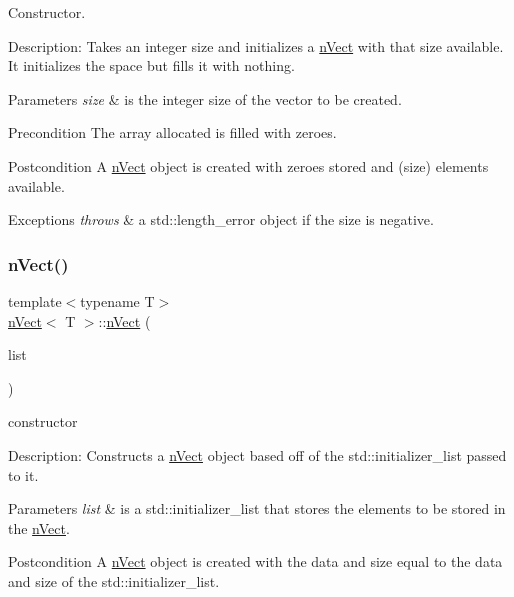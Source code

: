 Constructor. 

Description\+: Takes an integer size and initializes a \hyperlink{classnVect}{n\+Vect} with that size available. It initializes the space but fills it with nothing. 
\begin{DoxyParams}{Parameters}
{\em size} & is the integer size of the vector to be created. \\
\hline
\end{DoxyParams}
\begin{DoxyPrecond}{Precondition}
The array allocated is filled with zeroes. 
\end{DoxyPrecond}
\begin{DoxyPostcond}{Postcondition}
A \hyperlink{classnVect}{n\+Vect} object is created with zeroes stored and (size) elements available. 
\end{DoxyPostcond}

\begin{DoxyExceptions}{Exceptions}
{\em throws} & a std\+::length\+\_\+error object if the size is negative. \\
\hline
\end{DoxyExceptions}
\mbox{\label{classnVect_a8b77a6ebdc28746d61eebb7d8bbc0691}} 
\subsubsection{\texorpdfstring{n\+Vect()}{nVect()}\hspace{0.1cm}{\footnotesize\ttfamily [3/4]}}
{\footnotesize\ttfamily template$<$typename T$>$ \\
\hyperlink{classnVect}{n\+Vect}$<$ T $>$\+::\hyperlink{classnVect}{n\+Vect} (\begin{DoxyParamCaption}\item[{const std\+::initializer\+\_\+list$<$ T $>$ \&}]{list }\end{DoxyParamCaption})}



constructor 

Description\+: Constructs a \hyperlink{classnVect}{n\+Vect} object based off of the std\+::initializer\+\_\+list passed to it. 
\begin{DoxyParams}{Parameters}
{\em list} & is a std\+::initializer\+\_\+list that stores the elements to be stored in the \hyperlink{classnVect}{n\+Vect}. \\
\hline
\end{DoxyParams}
\begin{DoxyPostcond}{Postcondition}
A \hyperlink{classnVect}{n\+Vect} object is created with the data and size equal to the data and size of the std\+::initializer\+\_\+list. 
\end{DoxyPostcond}
\mbox{\label{classnVect_ad47ea98ac300eeaa3aab9322bfe20e76}} 
